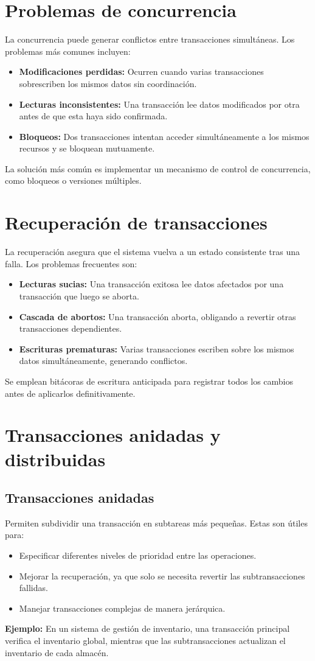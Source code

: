 \documentclass[12pt,a4paper]{article}
\begin{document}
\section{Problemas de concurrencia}
La concurrencia puede generar conflictos entre transacciones simultáneas. Los problemas más comunes incluyen:
\begin{itemize}
    \item \textbf{Modificaciones perdidas:} Ocurren cuando varias transacciones sobrescriben los mismos datos sin coordinación.  
    \item \textbf{Lecturas inconsistentes:} Una transacción lee datos modificados por otra antes de que esta haya sido confirmada.
    \item \textbf{Bloqueos:} Dos transacciones intentan acceder simultáneamente a los mismos recursos y se bloquean mutuamente.
\end{itemize}
La solución más común es implementar un mecanismo de control de concurrencia, como bloqueos o versiones múltiples.

\section{Recuperación de transacciones}
La recuperación asegura que el sistema vuelva a un estado consistente tras una falla. Los problemas frecuentes son:
\begin{itemize}
    \item \textbf{Lecturas sucias:} Una transacción exitosa lee datos afectados por una transacción que luego se aborta.
    \item \textbf{Cascada de abortos:} Una transacción aborta, obligando a revertir otras transacciones dependientes.
    \item \textbf{Escrituras prematuras:} Varias transacciones escriben sobre los mismos datos simultáneamente, generando conflictos.
\end{itemize}
Se emplean bitácoras de escritura anticipada para registrar todos los cambios antes de aplicarlos definitivamente.

\section{Transacciones anidadas y distribuidas}
\subsection{Transacciones anidadas}
Permiten subdividir una transacción en subtareas más pequeñas. Estas son útiles para:
\begin{itemize}
    \item Especificar diferentes niveles de prioridad entre las operaciones.
    \item Mejorar la recuperación, ya que solo se necesita revertir las subtransacciones fallidas.
    \item Manejar transacciones complejas de manera jerárquica.
\end{itemize}
\textbf{Ejemplo:}  
En un sistema de gestión de inventario, una transacción principal verifica el inventario global, mientras que las subtransacciones actualizan el inventario de cada almacén.
\end{document}

